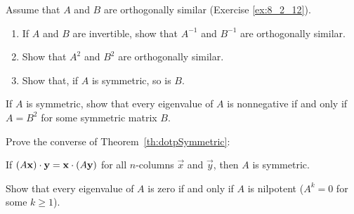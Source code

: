 \documentclass{ximera}
\begin{document}
\begin{problem}\label{prob:ortho14a}
Assume that $A$ and $B$ are orthogonally similar (Exercise \ref{ex:8_2_12}).


\begin{enumerate} 
\item If $A$ and $B$ are invertible, show that $A^{-1}$ and $B^{-1}$ are orthogonally similar.

\item Show that $A^{2}$ and $B^{2}$ are orthogonally similar.

\item Show that, if $A$ is symmetric, so is $B$.

\end{enumerate}


\end{problem}

\begin{problem}\label{prob:ortho15}
If $A$ is symmetric, show that every eigenvalue of $A$ is nonnegative if and only if $A = B^{2}$ for some symmetric matrix $B$.
\end{problem}

\begin{problem}\label{ex:8_2_15}
Prove the converse of Theorem~\ref{th:dotpSymmetric}:

If $(A\mathbf{x}) \cdot \mathbf{y} = \mathbf{x} \cdot (A\mathbf{y})$ for all $n$-columns $\vec{x}$ and $\vec{y}$, then $A$ is symmetric.

\end{problem}

\begin{problem}\label{prob:ortho17}
Show that every eigenvalue of $A$ is zero if and only if $A$ is nilpotent ($A^{k} = 0$ for some $k \geq 1$).
\end{problem}
\end{document}
